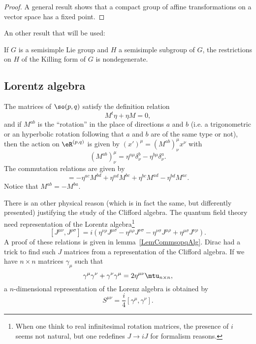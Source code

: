 \begin{proof}
A general result shows that a compact group of affine transformations on a vector space has a fixed point.

\end{proof}

An other result that will be used:
\begin{lemma}		\label{lem:Killing_ss_descent}
If $G$ is a semisimple Lie group and $H$ a semisimple subgroup of $G$, the restrictions on $H$ of the Killing form of $G$ is nondegenerate.
\end{lemma}

\subsection{Lorentz algebra}

\begin{lemma}     \label{LemCommsopqAlg}
The matrices of $\so(p,q)$ satisfy the definition relation
\begin{equation}
    M^t\eta+\eta M=0,
\end{equation}
and if $M^{ab}$ is the ``rotation'' in the place of directions $a$ and $b$ (i.e. a trigonometric or an hyperbolic rotation following that $a$ and $b$ are of the same type or not), then the action on $\eR^{(p,q)}$ is given by $(x')^{\mu}=(M^{ab})^{\mu}_{\nu}x^{\nu}$ with
\begin{equation}
    (M^{ab})^{\mu}_{\nu}=\eta^{a\mu}\delta^b_{\nu}-\eta^{b\mu}\delta^a_{\nu}.
\end{equation}
The commutation relations are given by
\begin{equation}
    [M^{ab},M^{cd}]=-\eta^{ac}M^{bd}+\eta^{ad}M^{bc}+\eta^{bc}M^{ad}-\eta^{bd}M^{ac}.
\end{equation}
Notice that $M^{ab}=-M^{ba}$.
\end{lemma}

There is an other physical reason (which is in fact the same, but differently presented) justifying the study of the Clifford algebra. The quantum field theory need representation of the Lorentz algebra\footnote{When one think to real infinitesimal rotation matrices, the presence of $i$ seems not natural, but one redefines $J\to iJ$ for formalism reasons.}
\[
 [J^{\mu\nu},J^{\rho\sigma}]=i(\eta^{\nu\rho}J^{\mu\sigma}-\eta^{\mu\rho}J^{\nu\sigma}
 -\eta^{\nu\sigma}J^{\mu\rho}+\eta^{\mu\sigma}J^{\nu\rho}).
\]
A proof of these relations is given in lemma~\ref{LemCommsopqAlg}. Dirac had a trick to find such $J$ matrices from a representation of the Clifford algebra. If we have $n\times n$ matrices $\gamma_{\mu}$ such that
\[
    \gamma^{\mu}\gamma^{\nu}+\gamma^{\nu}\gamma^{\mu}=2\eta^{\mu\nu}\mtu_{n\times n},
\]
a $n$-dimensional representation of the Lorenz algebra is obtained by
\[
    S^{\mu\nu}=\frac{i}{4}\left[\gamma^{\mu},\gamma^{\nu}\right].
\]

